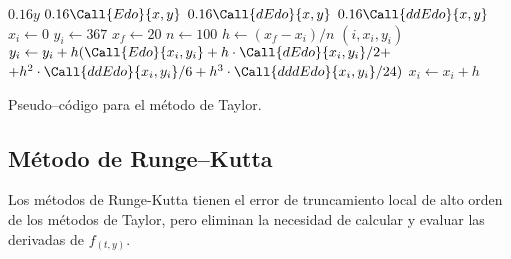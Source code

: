 \documentclass[english,spanish,Ce-table,Ce-theorem]{CabesHW}
\begin{document}
\begin{algorithm}[H]
    \centering
    \begin{myalg}[1]
     
        \State \Output $0.16 y$
    \EndFunction
    \State \phantom{}
     
        \State \Output $0.16 \Call{Edo}{x,y}$
    \EndFunction
    \State \phantom{}
     
        \State \Output $0.16 \Call{dEdo}{x,y}$
    \EndFunction
    \State \phantom{}
     
        \State \Output $0.16 \Call{ddEdo}{x,y}$
    \EndFunction
    \State \phantom{}
    \State $x_i \gets 0$ 
    \State $y_i \gets 367$ 
    \State $x_f \gets 20$ 
    \State $n \gets 100$ 
    \State \phantom{}
    \State $h \gets (x_f - x_i)/n$ 
        \State \Output $(i, x_i, y_i)$
        \State \phantom{}
        \State $y_i \gets y_i + h(\Call{Edo}{x_i, y_i} + h\cdot\Call{dEdo}{x_i, y_i}/2 + $
        \Statex \hspace{5em}$+ h^2\cdot\Call{ddEdo}{x_i, y_i}/6 + h^3\cdot\Call{dddEdo}{x_i, y_i}/24)$
        \State $x_i \gets x_i + h$
    \EndFor
    \end{myalg}
    \caption{Pseudo--código para el método de Taylor.}
    \label{alg:taylor}
\end{algorithm}

\vspace{2em}
\subsection{Método de Runge--Kutta}
Los métodos de Runge-Kutta tienen el error de truncamiento local de alto orden de los métodos de Taylor, pero eliminan la necesidad de calcular y evaluar las derivadas de $f_{(t, y)}$.

\end{document}
